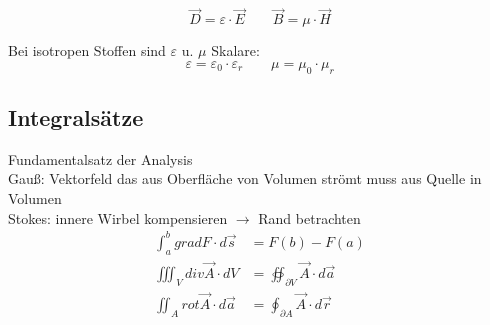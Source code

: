\[
    \vec{D} = \varepsilon \cdot \vec{E} \qquad
    \vec{B} = \mu \cdot \vec{H}
\]

Bei isotropen Stoffen sind $\varepsilon$ u. $\mu$ Skalare:
\[
    \varepsilon = \varepsilon_0 \cdot \varepsilon_r \qquad \mu = \mu_0 \cdot \mu_r
\]




\subsection{Integralsätze}
Fundamentalsatz der Analysis\\
Gauß: Vektorfeld das aus Oberfläche von Volumen strömt muss aus Quelle in Volumen\\
Stokes: innere Wirbel kompensieren $\rightarrow$ Rand betrachten
\begin{align*}
    \int_{a}^b grad F \cdot d \vec{s}     & = F(b) - F(a)                                  \\
    \iiint_V div \vec{A} \cdot dV         & = \oiint_{ \partial V} \vec{A} \cdot d \vec{a} \\
    \iint_{A} rot \vec{A} \cdot d \vec{a} & = \oint_{ \partial A} \vec{A} \cdot d \vec{r}
\end{align*}




